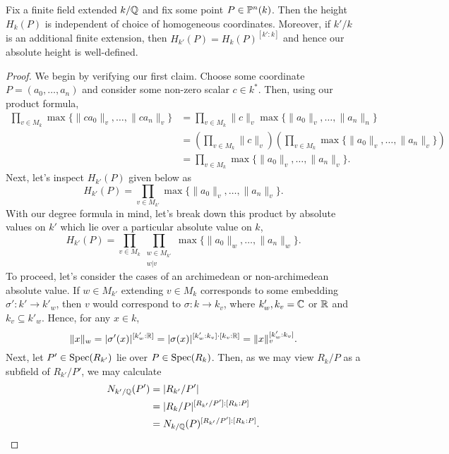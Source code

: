 \documentclass[12pt]{article}
\begin{document}
    \begin{proposition}
        Fix a finite field extended $k/\mathbb{Q}$ and fix some point $P \in \mathbb{P}^n(k)$.
        Then the height $H_k(P)$ is independent of choice of homogeneous coordinates.
        Moreover, if $k'/ k$ is an additional finite extension,
        then $H_{k'}(P) = H_k(P)^{[k' : k]}$ and hence our absolute height is well-defined.
    \end{proposition}

    \begin{proof}
        We begin by verifying our first claim. 
        Choose some coordinate $P = (a_0, \ldots, a_n)$ and consider some non-zero scalar $c \in k^*$.
        Then, using our product formula,
        \begin{align*}
            \prod_{v \in M_k} \max \{\|ca_0\|_v, \ldots, \|ca_n\|_v\}
            & = \prod_{v \in M_k} \|c\|_v \max\{\|a_0\|_v, \ldots, \|a_n\|_n\} \\
            & = \left(
                \prod_{v \in M_k} \|c\|_v
            \right) \left(
                \prod_{v \in M_k}\max \{\|a_0\|_v, \ldots, \|a_n\|_v\}
            \right) \\
            & = \prod_{v \in M_k}\max \{\|a_0\|_v, \ldots, \|a_n\|_v\}.
        \end{align*}
        Next, let's inspect $H_{k'}(P)$ given below as 
        \[
            H_{k'}(P) = \prod_{v \in M_{k'}} \max\{\|a_0\|_v, \ldots, \|a_n\|_v\}.
        \]
        With our degree formula in mind, 
        let's break down this product by absolute values on $k'$ which lie over a particular absolute value on $k$,
        \[
            H_{k'}(P) = \prod_{v \in M_k} \prod_{\substack{ w \in M_{k'} \\ w | v}}
            \max\{\|a_0\|_w, \ldots, \|a_n\|_w\}.
        \]
        To proceed, let's consider the cases of an archimedean or non-archimedean absolute value.
        If $w \in M_{k'}$ extending $v \in M_k$ corresponds to some embedding $\sigma' : k' \to k'_w$,
        then $v$ would correspond to $\sigma : k \to k_v$,
        where $k'_w, k_v = \mathbb{C}$ or $\mathbb{R}$ and $k_v \subseteq k'_w$.
        Hence, for any $x \in k$,
        \[
            \|x\|_w 
            = |\sigma'(x)|^{[k'_w : \mathbb{R}]}
            = |\sigma(x)|^{[k'_w : k_v] \cdot [k_v : \mathbb{R}]}
            = \|x\|_v^{[k'_w : k_v]}.
        \]
        Next, let $P' \in {\rm Spec}(R_{k'})$ lie over $P \in {\rm Spec}(R_k)$.
        Then, as we may view $R_k / P$ as a subfield of $R_{k'} / P'$,
         we may calculate
        \begin{align*}
            N_{k' / \mathbb{Q}}(P')
            & = |R_{k'} / P'| \\
            & = |R_k / P|^{[R_{k'} / P'] : [R_k : P]} \\
            & = N_{k / \mathbb{Q}}(P)^{[R_{k'} / P'] : [R_k : P]}.
        \end{align*}
    \end{proof}
\end{document}
